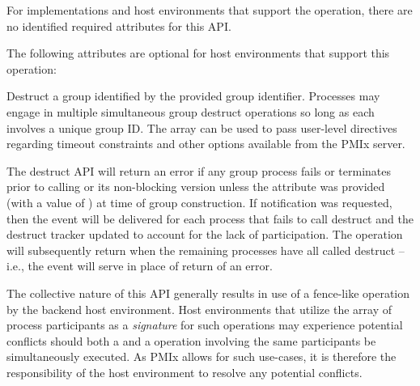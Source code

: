 \reqattrstart
For implementations and host environments that support the operation, there are no identified required
attributes for this \ac{API}.
\reqattrend

\optattrstart
The following attributes are optional for host environments that support this operation:


\optattrend

\descr

Destruct a group identified by the provided group identifier. Processes may engage in multiple simultaneous group destruct operations so long as each involves a unique group ID. The  array can be used to pass user-level directives regarding timeout constraints and other options available from the \ac{PMIx} server.

The destruct \ac{API} will return an error if any group process fails or terminates prior to calling  or its non-blocking version unless the  attribute was provided (with a value of ) at time of group construction. If notification was requested, then the  event will be delivered for each process that fails to call destruct and the destruct tracker updated to account for the lack of participation. The  operation will subsequently return  when the remaining processes have all called destruct – i.e., the event will serve in place of return of an error.

\advicermstart
The collective nature of this \ac{API} generally results in use of a fence-like operation by the backend host environment. Host environments that utilize the array of process participants as a \emph{signature} for such operations may experience potential conflicts should both a  and a  operation involving the same participants be simultaneously executed. As \ac{PMIx} allows for such use-cases, it is therefore the responsibility of the host environment to resolve any potential conflicts.
\advicermend

\subsection{}


